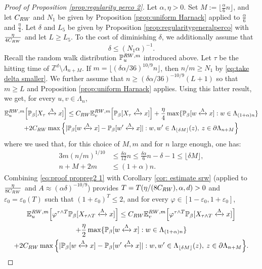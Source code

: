 \documentclass[11pt,a4paper]{article}
\numberwithin{equation}{section}
\theoremstyle{plain}
\theoremstyle{definition}
\newcommand{\connect}{\xleftrightarrow}
\begin{document}
\begin{proof}[Proof of Proposition \textup{\ref{prop:regularity perco 2}}] Let $\alpha,\eta>0$. Set $M:=\lfloor \tfrac{\alpha}{6} n\rfloor$, and let $C_{\rm RW}$ and $N_1$ be given by Proposition \ref{prop:uniform Harnack} applied to $\tfrac{\alpha}{6}$ and $\tfrac{\eta}{4}$.
Let $\delta$ and $L_5$ be given by Proposition \ref{prop:regularitygeneralperco} with $\frac{\eta}{4C_{\rm RW}}$ and let $L\geq L_5$. To the cost of diminishing $\delta$, we additionally assume that
\begin{equation}\label{eq:take delta smaller}
	\delta\leq (N_1\alpha)^{-1}.
\end{equation}
Recall the random walk distribution $\mathbb P^{{\rm RW},m}_u$ introduced above. Let $\tau$ be the hitting time of $\mathbb Z^d\setminus\Lambda_{n+M}$. If $m=\lfloor (\delta\alpha/36)^{10/9}n\rfloor$, then $n/m\geq N_1$ by \eqref{eq:take delta smaller}. We further assume that $n\geq (\delta\alpha/36)^{-10/9}(L+1)$ so that $m\geq L$ and Proposition \ref{prop:uniform Harnack} applies. Using this latter result, we get, for every $u,v\in \Lambda_n$,
\begin{multline}\label{eq:proof propreg2 1}
	\mathbb E^{{\rm RW},m}_u\Big[\mathbb P_\beta[X_\tau \connect{\Lambda\:}x]\Big]\leq C_{\rm RW}\mathbb E^{{\rm RW},m}_v\Big[\mathbb P_\beta[X_\tau \connect{\Lambda\:}x]\Big]+\frac{\eta}{4}\max\{\mathbb P_\beta[w \connect{\Lambda\:}x]:w\in \Lambda_{(1+\alpha)n}\}\\+2C_{\rm RW}\max \Big\{|\mathbb P_\beta[w \connect{\Lambda\:}x]-\mathbb P_\beta[w'\connect{\Lambda\:}x]|: w,w'\in \Lambda_{\lfloor \delta M\rfloor}(z), \: z\in \partial \Lambda_{n+M}\Big\} 
\end{multline}
where we used that, for this choice of $M,m$ and for $n$ large enough, one has: 
\begin{align}
3m(n/m)^{1/10}&\leq \frac{\delta \alpha}{12}n\leq \frac{\delta\alpha}{6}n-\delta-1\leq \lfloor\delta M\rfloor,\\
n+M+2m&\leq (1+\alpha)n.\end{align} 
Combining \eqref{eq:proof propreg2 1} with Corollary \ref{cor: estimate srw} (applied to $\frac{\eta}{8C_{\rm RW}}$ and $A\approx (\alpha\delta)^{-10/9}$) provides $T=T(\eta/(8C_{\rm RW}),\alpha,d)>0$ and $\varepsilon_0=\varepsilon_0(T)$ such that $(1+\varepsilon_0)^T\leq 2$, and for every $\varphi\in [1-\varepsilon_0,1+\varepsilon_0]$,
\begin{multline}\label{eq:proof propreg2 1.5}
	\mathbb E_u^{{\rm RW},m}\Big[\varphi^{\tau\wedge T}\mathbb P_\beta[X_{\tau\wedge T}\connect{\Lambda\:}x]\Big]\leq C_{\rm RW}\mathbb E_v^{{\rm RW},m}\Big[\varphi^{\tau\wedge T}\mathbb P_\beta[X_{\tau\wedge T}\connect{\Lambda\:}x]\Big]\\+\frac{\eta}{2}\max\{\mathbb P_\beta[w\connect{\Lambda\:}x]:w\in \Lambda_{(1+\alpha)n}\}\\+2C_{\rm RW}\max \Big\{|\mathbb P_\beta[w\connect{\Lambda\:}x]-\mathbb P_\beta[w'\connect{\Lambda\:}x]|: w,w'\in \Lambda_{\lfloor \delta M\rfloor}(z), \: z\in \partial \Lambda_{n+M}\Big\}.

\end{multline}
\end{proof}
\end{document}
